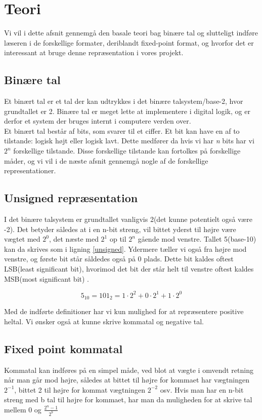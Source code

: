 \section{Teori}

Vi vil i dette afsnit gennemgå den basale teori bag binære tal og slutteligt indføre læseren i de forskellige formater, deriblandt fixed-point format, og hvorfor det er interessant at bruge denne repræsentation  i vores projekt.
\subsection{Binære tal}
Et binært tal er et tal der kan udtrykkes i det binære talsystem/base-2, hvor grundtallet er 2. Binære tal er meget lette at implementere i digital logik, og er derfor et system der bruges internt i computere verden over. \\ 
Et binært tal består af bits, som svarer til et ciffer. Et bit kan have en af to tilstande: logisk højt eller logisk lavt. Dette medfører da hvis vi har \textit{n} bits har vi $2^n$ forskellige tilstande. Disse forskellige tilstande kan fortolkes på forskellige måder, og vi vil i de næste afsnit gennemgå nogle af de forskellige representationer.
\subsection{Unsigned repræsentation}
I det binære talsystem er grundtallet vanligvis 2(det kunne potentielt også være -2). Det betyder således at i en n-bit streng, vil  bittet yderst til højre være vægtet med  $2^0$, det næste med $2^1$ op til $2^n$ gående mod venstre. Tallet 5(base-10) kan da skrives som i ligning \ref{unsigned}. Ydermere tæller vi også fra højre mod venstre, og første bit står såldedes også på 0 plads. Dette bit kaldes oftest  LSB(least significant bit), hvorimod det bit der står helt til venstre oftest kaldes MSB(most significant bit) \cite[s. 18]{Dlogic}. 


\begin{equation}\label{unsigned}
5_{10} = 101_{2} = 1 \cdot 2^2+0 \cdot 2^1+1 \cdot 2^0
\end{equation}


Med de indførte definitioner har vi kun mulighed for at repræsentere positive heltal. Vi ønsker også at kunne skrive kommatal og negative tal.

\subsection{Fixed point kommatal}
Kommatal kan indføres på en simpel måde, ved blot at vægte i omvendt retning når man går mod højre, således at bittet til højre for kommaet har vægtningen $2^{-1}$, bittet 2 til højre for kommat vægtningen $2^{-2}$ osv. Hvis man har en n-bit streng med b tal til højre for kommaet, har man da muligheden for at skrive tal mellem 0 og $\frac{2^n-1}{2^b}$ \cite[s.~4]{Yates}

